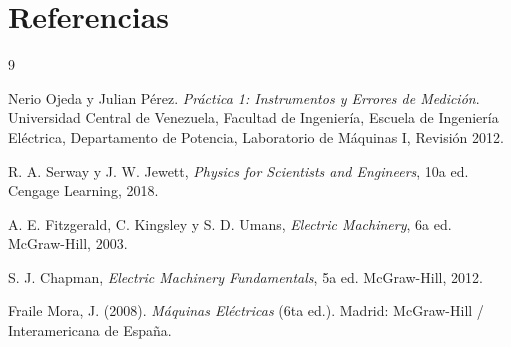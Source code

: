 \section{Referencias}

\begin{thebibliography}{9}

Nerio Ojeda y Julian Pérez. \emph{Práctica 1: Instrumentos y Errores de Medición}. Universidad Central de Venezuela, Facultad de Ingeniería, Escuela de Ingeniería Eléctrica, Departamento de Potencia, Laboratorio de Máquinas I, Revisión 2012.

R. A. Serway y J. W. Jewett, \emph{Physics for Scientists and Engineers}, 10a ed. Cengage Learning, 2018.

A. E. Fitzgerald, C. Kingsley y S. D. Umans, \emph{Electric Machinery}, 6a ed. McGraw-Hill, 2003.

S. J. Chapman, \emph{Electric Machinery Fundamentals}, 5a ed. McGraw-Hill, 2012.

Fraile Mora, J. (2008). \textit{Máquinas Eléctricas} (6ta ed.). Madrid: McGraw-Hill / Interamericana de España.

\end{thebibliography}
